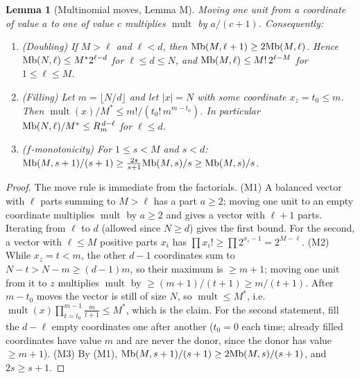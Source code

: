 \documentclass[11pt]{article}
\newcommand{\mult}{\operatorname{mult}}
\newtheorem{lemma}[theorem]{Lemma}
\theoremstyle{definition}
\theoremstyle{remark}
\begin{document}
\begin{lemma}[Multinomial moves, Lemma M]\label{lem:M}
Moving one unit from a coordinate of value $a$ to one of value $c$ multiplies $\mult$ by $a/(c+1)$. Consequently:
\begin{enumerate}
\item[(M1)] (Doubling) If $M>\ell$ and $\ell<d$, then $\mathrm{Mb}(M,\ell+1)\ge2\mathrm{Mb}(M,\ell)$. Hence $\mathrm{Mb}(N,\ell)\le M^\ast2^{\ell-d}$ for $\ell\le d\le N$,
and $\mathrm{Mb}(M,\ell)\le M!\,2^{\ell-M}$ for $1\le\ell\le M$.
\item[(M2)] (Filling) Let $m=\lfloor N/d\rfloor$ and let $|x|=N$ with some coordinate $x_z=t_0\le m$. Then
$\mult(x)/M^\ast\le m!/(t_0!\,m^{m-t_0})$. In particular $\mathrm{Mb}(N,\ell)/M^\ast\le R_m^{\,d-\ell}$ for $\ell\le d$.
\item[(M3)] ($f$-monotonicity) For $1\le s<M$ and $s<d$: $\mathrm{Mb}(M,s+1)/(s+1)\ge\frac{2s}{s+1}\mathrm{Mb}(M,s)/s\ge\mathrm{Mb}(M,s)/s$.
\end{enumerate}
\end{lemma}
\begin{proof}
The move rule is immediate from the factorials. (M1) A balanced vector with $\ell$ parts summing to $M>\ell$ has a part $a\ge2$; moving one
unit to an empty coordinate multiplies $\mult$ by $a\ge2$ and gives a vector with $\ell+1$ parts. Iterating from $\ell$ to $d$ (allowed
since $N\ge d$) gives the first bound. For the second, a vector with $\ell\le M$ positive parts $x_i$ has $\prod x_i!\ge\prod2^{x_i-1}=2^{M-\ell}$.
(M2) While $x_z=t<m$, the other $d-1$ coordinates sum to $N-t>N-m\ge(d-1)m$, so their maximum is $\ge m+1$; moving one unit from it to $z$
multiplies $\mult$ by $\ge(m+1)/(t+1)\ge m/(t+1)$. After $m-t_0$ moves the vector is still of size $N$, so $\mult\le M^\ast$, i.e.\
$\mult(x)\prod_{t=t_0}^{m-1}\frac m{t+1}\le M^\ast$, which is the claim. For the second statement, fill the $d-\ell$ empty coordinates one after
another ($t_0=0$ each time; already filled coordinates have value $m$ and are never the donor, since the donor has value $\ge m+1$). (M3)
By (M1), $\mathrm{Mb}(M,s+1)/(s+1)\ge2\mathrm{Mb}(M,s)/(s+1)$, and $2s\ge s+1$.
\end{proof}
\end{document}
